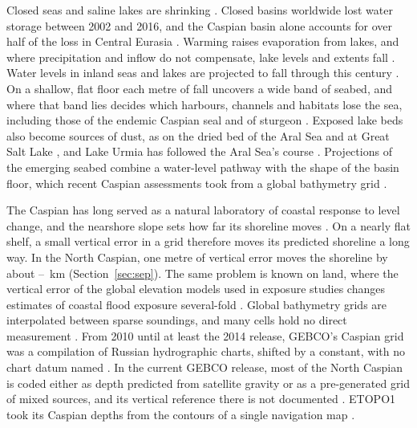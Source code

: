 
Closed seas and saline lakes are shrinking \citep{wurtsbaugh2017,yao2023}. Closed basins worldwide lost water storage between 2002 and 2016, and the Caspian basin alone accounts for over half of the loss in Central Eurasia \citep{wang2018}. Warming raises evaporation from lakes, and where precipitation and inflow do not compensate, lake levels and extents fall \citep{woolway2020}. Water levels in inland seas and lakes are projected to fall through this century \citep{prange2020}. On a shallow, flat floor each metre of fall uncovers a wide band of seabed, and where that band lies decides which harbours, channels and habitats lose the sea, including those of the endemic Caspian seal and of sturgeon \citep{court2025}. Exposed lake beds also become sources of dust, as on the dried bed of the Aral Sea \citep{indoitu2015} and at Great Salt Lake \citep{skiles2018}, and Lake Urmia has followed the Aral Sea's course \citep{aghakouchak2015}. Projections of the emerging seabed combine a water-level pathway with the shape of the basin floor, which recent Caspian assessments took from a global bathymetry grid \citep{court2025,duan2025}.

The Caspian has long served as a natural laboratory of coastal response to level change, and the nearshore slope sets how far its shoreline moves \citep{kaplin1995}. On a nearly flat shelf, a small vertical error in a grid therefore moves its predicted shoreline a long way. In the North Caspian, one metre of vertical error moves the shoreline by about --~km (Section~\ref{sec:sep}). The same problem is known on land, where the vertical error of the global elevation models used in exposure studies changes estimates of coastal flood exposure several-fold \citep{kulp2019,hooijer2021}. Global bathymetry grids are interpolated between sparse soundings, and many cells hold no direct measurement \citep{weatherall2015}. From 2010 until at least the 2014 release, GEBCO's Caspian grid was a compilation of Russian hydrographic charts, shifted by a constant, with no chart datum named \citep{gebco2014_doc}. In the current GEBCO release, most of the North Caspian is coded either as depth predicted from satellite gravity or as a pre-generated grid of mixed sources, and its vertical reference there is not documented \citep{gebco2026}. ETOPO1 took its Caspian depths from the contours of a single navigation map \citep{amante2009}.

